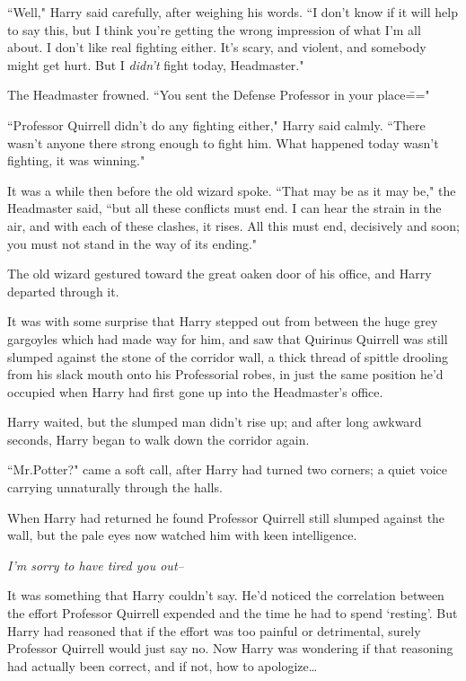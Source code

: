 ``Well," Harry said carefully, after weighing his words. ``I don't know if it will help to say this, but I think you're getting the wrong impression of what I'm all about. I don't like real fighting either. It's scary, and violent, and somebody might get hurt. But I \emph{didn't} fight today, Headmaster."

The Headmaster frowned. ``You sent the Defense Professor in your place\==="

``Professor Quirrell didn't do any fighting either," Harry said calmly. ``There wasn't anyone there strong enough to fight him. What happened today wasn't fighting, it was winning."

It was a while then before the old wizard spoke. ``That may be as it may be," the Headmaster said, ``but all these conflicts must end. I can hear the strain in the air, and with each of these clashes, it rises. All this must end, decisively and soon; you must not stand in the way of its ending."

The old wizard gestured toward the great oaken door of his office, and Harry departed through it.

\later

It was with some surprise that Harry stepped out from between the huge grey gargoyles which had made way for him, and saw that Quirinus Quirrell was still slumped against the stone of the corridor wall, a thick thread of spittle drooling from his slack mouth onto his Professorial robes, in just the same position he'd occupied when Harry had first gone up into the Headmaster's office.

Harry waited, but the slumped man didn't rise up; and after long awkward seconds, Harry began to walk down the corridor again.

``Mr.\?Potter?" came a soft call, after Harry had turned two corners; a quiet voice carrying unnaturally through the halls.

When Harry had returned he found Professor Quirrell still slumped against the wall, but the pale eyes now watched him with keen intelligence.

\emph{I'm sorry to have tired you out\---}

It was something that Harry couldn't say. He'd noticed the correlation between the effort Professor Quirrell expended and the time he had to spend `resting'. But Harry had reasoned that if the effort was too painful or detrimental, surely Professor Quirrell would just say no. Now Harry was wondering if that reasoning had actually been correct, and if not, how to apologize{\ldots}

